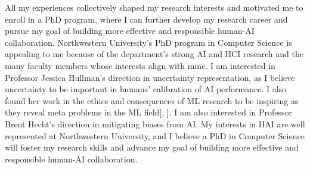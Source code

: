 


All my experiences collectively shaped my research interests and motivated me to enroll in a PhD program, where I can further develop my research career and pursue my goal of building more effective and responsible human-AI collaboration. 
Northwestern University's PhD program in Computer Science is appealing to me because of the department's strong AI and HCI research and the many faculty members whose interests align with mine. 
I am interested in Professor Jessica Hullman's direction in uncertainty representation, as I believe uncertainty to be important in humans' calibration of AI performance. I also found her work in the ethics and consequences of ML research to be inspiring as they reveal meta problems in the ML field[, ].
I am also interested in Professor Brent Hecht's direction in mitigating biases from AI.
My interests in HAI are well represented at Northwestern University, and I believe a PhD in Computer Science will foster my research skills and advance my goal of building more effective and responsible human-AI collaboration.
